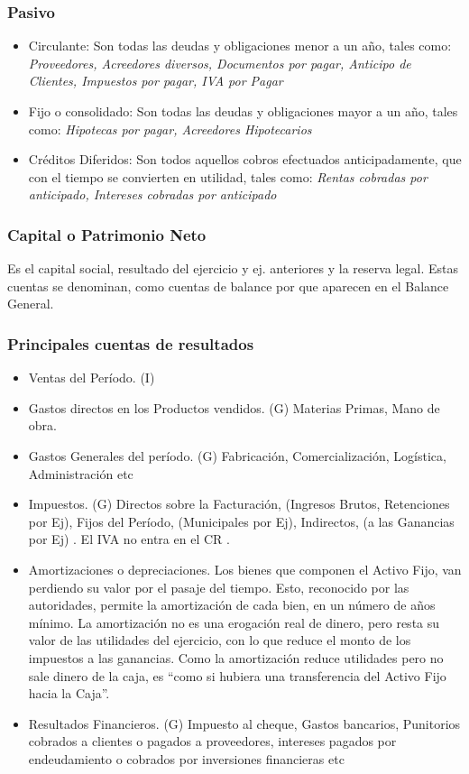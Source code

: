 \documentclass[titlepage,a4paper]{article}
\begin{document}
\subsubsection*{Pasivo}
\begin{itemize}
    \item Circulante: Son todas las deudas y obligaciones menor a un año, tales como: \textit{Proveedores, Acreedores diversos, Documentos por pagar, Anticipo de Clientes, Impuestos por pagar, IVA por Pagar}
    \item Fijo o consolidado: Son todas las deudas y obligaciones mayor a un año, tales como: \textit{Hipotecas por pagar, Acreedores Hipotecarios}
    \item Créditos Diferidos: Son todos aquellos cobros efectuados anticipadamente, que con el tiempo se convierten en utilidad, tales como: \textit{Rentas cobradas por anticipado, Intereses cobradas por anticipado}
\end{itemize}

\subsubsection*{Capital o Patrimonio Neto}
Es el capital social, resultado del ejercicio y ej. anteriores y la reserva legal. Estas cuentas se denominan, como cuentas de balance por que aparecen en el Balance General.

\subsubsection*{Principales cuentas de resultados}
\begin{itemize}
    \item Ventas del Período. (I)
    \item Gastos directos en los Productos vendidos. (G) Materias Primas, Mano de obra.
    \item Gastos Generales del período. (G) Fabricación, Comercialización, Logística, Administración etc
    \item Impuestos. (G) Directos sobre la Facturación, (Ingresos Brutos, Retenciones por Ej), Fijos del Período, (Municipales por Ej), Indirectos, (a las Ganancias por Ej) . El IVA no entra en el CR .
    \item Amortizaciones o depreciaciones. Los bienes que componen el Activo Fijo, van perdiendo su valor por el pasaje del tiempo. Esto, reconocido por las autoridades, permite la amortización de cada bien, en un número de años mínimo. La amortización no es una erogación real de dinero, pero resta su valor de las utilidades del ejercicio, con lo que reduce el monto de los impuestos a las ganancias. Como la amortización reduce utilidades pero no sale dinero de la caja, es “como si hubiera una transferencia del Activo Fijo hacia la Caja”.
    \item Resultados Financieros. (G) Impuesto al cheque, Gastos bancarios, Punitorios cobrados a clientes o pagados a proveedores, intereses pagados por endeudamiento o cobrados por inversiones financieras etc
\end{itemize}
\end{document}
